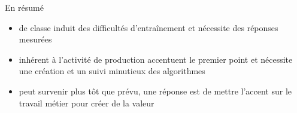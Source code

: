\documentclass{beamer}
\begin{document}
\begin{frame}{}{En résumé}
	\begin{itemize}
		\item {} de classe induit des difficultés d'entraînement et nécessite des réponses mesurées
		\item {} inhérent à l'activité de production accentuent le premier point et nécessite une création et un suivi minutieux des algorithmes
		\item {} peut survenir plus tôt que prévu, une réponse est de mettre l'accent sur le travail métier pour créer de la valeur
	\end{itemize}
\end{frame}


%	
%	

\end{document}
